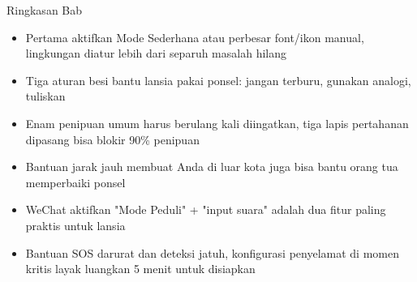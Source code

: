 \begin{tcbsummary}{Ringkasan Bab}
\begin{itemize}
  \item Pertama aktifkan Mode Sederhana atau perbesar font/ikon manual, lingkungan diatur lebih dari separuh masalah hilang
  \item Tiga aturan besi bantu lansia pakai ponsel: jangan terburu, gunakan analogi, tuliskan
  \item Enam penipuan umum harus berulang kali diingatkan, tiga lapis pertahanan dipasang bisa blokir 90\% penipuan
  \item Bantuan jarak jauh membuat Anda di luar kota juga bisa bantu orang tua memperbaiki ponsel
  \item WeChat aktifkan "Mode Peduli" + "input suara" adalah dua fitur paling praktis untuk lansia
  \item Bantuan SOS darurat dan deteksi jatuh, konfigurasi penyelamat di momen kritis layak luangkan 5 menit untuk disiapkan
\end{itemize}

\end{tcbsummary}
